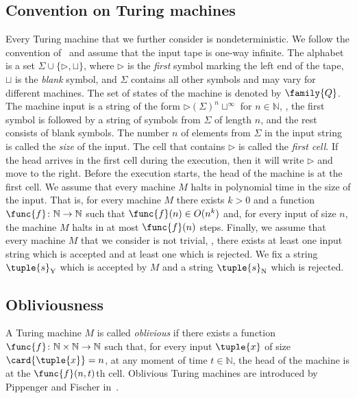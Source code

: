 \documentclass{lmcs}
\begin{document}
\subsection*{Convention on Turing machines}
Every Turing machine that we further consider is nondeterministic. We follow the convention of~\cite{papadimitriou_book} and assume that the input tape is one-way infinite. The alphabet is a set $\Sigma\cup\{\triangleright,\sqcup\}$, where $\triangleright$ is the \emph{first} symbol marking the left end of the tape, $\sqcup$ is the \emph{blank} symbol, and $\Sigma$ contains all other symbols and may vary for different machines. The set of states of the machine is denoted by $\family{Q}$. The machine input is a string of the form $\triangleright(\Sigma)^n\sqcup^\infty$ for $n\in\mathbb{N}$, \ie, the first symbol is followed by a string of symbols from $\Sigma$ of length $n$, and the rest consists of blank symbols. The number $n$ of elements from $\Sigma$ in the input string is called the \emph{size} of the input. The cell  that contains $\triangleright$ is called the \emph{first cell}. If the head arrives in the first cell during the execution, then it will write $\triangleright$ and move to the right. Before the execution starts, the head of the machine is at the first cell. We assume that every machine $M$ halts in polynomial time in the size of the input. That is, for every machine $M$ there exists $k>0$ and a function $\func{f}\colon\mathbb{N}\to\mathbb{N}$ such that $\func{f}(n)\in O(n^k)$ and, for every input of size $n$, the machine $M$ halts in at most $\func{f}(n)$ steps. Finally, we assume that every machine $M$ that we consider is not trivial, \ie, there exists at least one input string which is accepted and at least one which is rejected. 
We fix a string $\tuple{s}_{\mathrm{Y}}$ which is accepted by $M$ and a string $\tuple{s}_{\mathrm{N}}$ which is rejected.
\subsection{Obliviousness}\label{subsection:obliviousness}


A Turing machine $M$ is called \emph{oblivious} if there exists a function $\func{f}\colon\mathbb{N}\times\mathbb{N}\to\mathbb{N}$ such that, for every input $\tuple{x}$ of size $\card{\tuple{x}}=n$, at any moment of time $t\in\mathbb{N}$, the head of the machine is at the $\func{f}(n,t)$th cell. Oblivious Turing machines are introduced by Pippenger and Fischer in~\cite{pippenger1979}.
\end{document}
